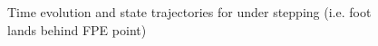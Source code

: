 \begin{figure}[!h]
	\begin{center}
	\end{center}
  	\caption{Time evolution and state trajectories for under stepping (i.e. foot lands behind FPE point)}
	\label{sim:under}
\end{figure}

